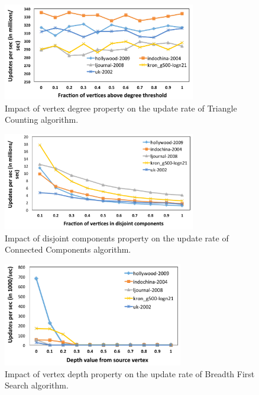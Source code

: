 \begin{figure}[!t]
\centering
\includegraphics [width=0.75\textwidth,height=\textheight,keepaspectratio]{figures/prop1.pdf}
\caption{Impact of vertex degree property on the update rate of Triangle Counting algorithm.}
\label{fig:prop1}
\end{figure}

\begin{figure}[!t]
\centering
\includegraphics [width=0.75\textwidth,height=\textheight,keepaspectratio]{figures/prop2.pdf}
\caption{Impact of disjoint components property on the update rate of Connected Components algorithm.}
\label{fig:prop2}
\end{figure}

\begin{figure}[!t]
\centering
\includegraphics [width=0.70\textwidth,height=\textheight,keepaspectratio]{figures/prop3.pdf}
\caption{Impact of vertex depth property on the update rate of Breadth First Search algorithm.}
\label{fig:prop3}
\end{figure}




